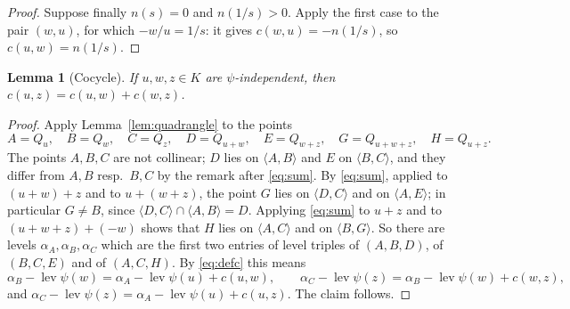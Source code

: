 \documentclass[11pt]{amsart}
\newtheorem{lemma}[theorem]{Lemma}
\theoremstyle{definition}
\theoremstyle{remark}
\newcommand{\lev}{\operatorname{lev}}
\newcommand{\la}{\langle}
\newcommand{\ra}{\rangle}
\begin{document}
\begin{proof}
Suppose finally $n(s)=0$ and $n(1/s)>0$. Apply the first case to the pair $(w,u)$, for which $-w/u=1/s$: it gives $c(w,u)=-n(1/s)$, so $c(u,w)=n(1/s)$.
\end{proof}

\begin{lemma}[Cocycle]\label{lem:cocycle}
If $u,w,z\in K$ are $\psi$-independent, then $c(u,z)=c(u,w)+c(w,z)$.
\end{lemma}

\begin{proof}
Apply Lemma~\ref{lem:quadrangle} to the points
\[ A=Q_u,\quad B=Q_w,\quad C=Q_z,\quad D=Q_{u+w},\quad E=Q_{w+z},\quad G=Q_{u+w+z},\quad H=Q_{u+z}. \]
The points $A,B,C$ are not collinear; $D$ lies on $\la A,B\ra$ and $E$ on $\la B,C\ra$, and they differ from $A,B$ resp.\ $B,C$ by the remark after \eqref{eq:sum}.
By \eqref{eq:sum}, applied to $(u+w)+z$ and to $u+(w+z)$, the point $G$ lies on $\la D,C\ra$ and on $\la A,E\ra$; in particular $G\neq B$, since $\la D,C\ra\cap\la A,B\ra=D$. Applying \eqref{eq:sum} to $u+z$ and to $(u+w+z)+(-w)$ shows that $H$ lies on $\la A,C\ra$ and on $\la B,G\ra$.
So there are levels $\alpha_A,\alpha_B,\alpha_C$ which are the first two entries of level triples of $(A,B,D)$, of $(B,C,E)$ and of $(A,C,H)$. By \eqref{eq:defc} this means
\[ \alpha_B-\lev\psi(w)=\alpha_A-\lev\psi(u)+c(u,w),\qquad \alpha_C-\lev\psi(z)=\alpha_B-\lev\psi(w)+c(w,z), \]
and $\alpha_C-\lev\psi(z)=\alpha_A-\lev\psi(u)+c(u,z)$. The claim follows.
\end{proof}
\end{document}
